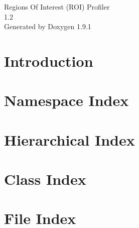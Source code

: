 \let\mypdfximage\pdfximage\def\pdfximage{\immediate\mypdfximage}\documentclass[twoside]{book}
\newcommand{\+}{\discretionary{\mbox{\scriptsize$\hookleftarrow$}}{}{}}
\newcommand{\clearemptydoublepage}{%
  \newpage{\pagestyle{empty}\cleardoublepage}%
}
\begin{document}
\raggedbottom

\hypersetup{pageanchor=false,
             bookmarksnumbered=true,
             pdfencoding=unicode
            }
\begin{titlepage}
\vspace*{7cm}
\begin{center}%
{\Large Regions Of Interest (ROI) Profiler \\[1ex]\large 1.\+2 }\\
\vspace*{1cm}
{\large Generated by Doxygen 1.9.1}\\
\end{center}
\end{titlepage}
\clearemptydoublepage
{}
\tableofcontents
\clearemptydoublepage
{}
\hypersetup{pageanchor=true}

\chapter{Introduction}
\label{index}\hypertarget{index}{}
\chapter{Namespace Index}

\chapter{Hierarchical Index}

\chapter{Class Index}

\chapter{File Index}

\end{document}
